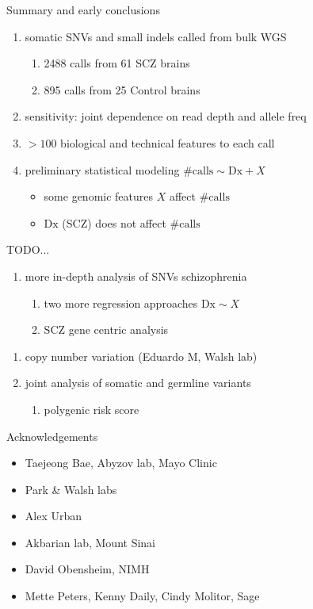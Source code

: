 \documentclass[usenames,dvipsnames]{beamer}
\begin{document}
\begin{frame}{Summary and early conclusions}
\begin{enumerate}
\item somatic SNVs and small indels called from bulk WGS 
\begin{enumerate}
\item 2488 calls from 61 SCZ brains
\item 895 calls from 25 Control brains
\end{enumerate}
\item sensitivity: joint dependence on read depth and allele freq
\item \(> 100\) biological and technical features to each call
\item preliminary statistical modeling \(\mathrm{\#calls} \sim \mathrm{Dx} + X\)
\begin{itemize}
\item some genomic features \(X\) affect \(\mathrm{\#calls}\)
\item \(\mathrm{Dx}\) (SCZ) does not affect \(\mathrm{\#calls}\)
\end{itemize}
\end{enumerate}
\end{frame}

\begin{frame}{TODO...}
\begin{enumerate}
\item more in-depth analysis of SNVs schizophrenia
\begin{enumerate}
\item two more regression approaches \(\mathrm{Dx} \sim X\)
\item SCZ gene centric analysis
\end{enumerate}
\end{enumerate}
\begin{enumerate}
\item copy number variation (Eduardo M, Walsh lab)
\item joint analysis of somatic and germline variants
\begin{enumerate}
\item polygenic risk score
\end{enumerate}
\end{enumerate}
\end{frame}

\begin{frame}{Acknowledgements}
\begin{itemize}
\item Taejeong Bae, Abyzov lab, Mayo Clinic
\item Park \& Walsh labs %
\item Alex Urban %
\item Akbarian lab, Mount Sinai %
\item David Obensheim, NIMH
\item Mette Peters, Kenny Daily, Cindy Molitor, Sage
\end{itemize}
\end{frame}
\end{document}
